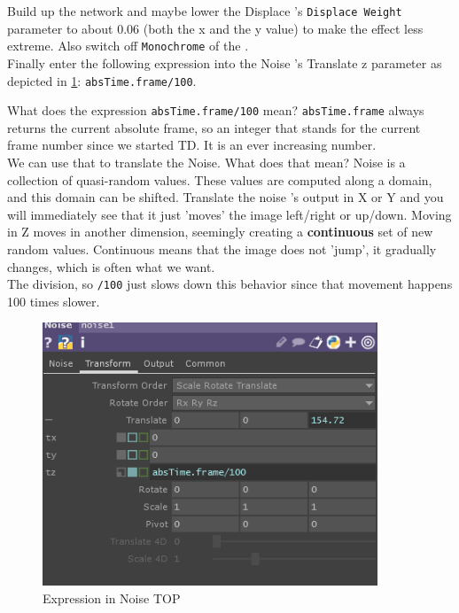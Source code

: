 Build up the network and maybe lower the Displace \TOP's \texttt{Displace Weight} parameter to about $0.06$ (both the x and the y value) to make the effect less extreme. Also switch off \texttt{Monochrome} of the .\\
Finally enter the following expression into the Noise \TOP's Translate z parameter as depicted in \ref{fig:expressionNoiseTOP}: \texttt{absTime.frame/100}.

\begin{framed}
	What does the expression \texttt{absTime.frame/100} mean? \texttt{absTime.frame} always returns the current absolute frame, so an integer that stands for the current frame number since we started TD. It is an ever increasing number.\\
	We can use that to translate the Noise. What does that mean? Noise is a collection of quasi-random values. These values are computed along a domain, and this domain can be shifted. Translate the noise \TOP's output in X or Y and you will immediately see that it just 'moves' the image left/right or up/down. Moving in Z moves in another dimension, seemingly creating a \textbf{continuous} set of new random values. Continuous means that the image does not 'jump', it gradually changes, which is often what we want.\\
	The division, so \texttt{/100} just slows down this behavior since that movement happens 100 times slower.
\end{framed}

\begin{figure}[H]
	\centering
	\includegraphics[width=10cm]{img/noiseTopExpr.PNG}
	\caption[An expression in the Transform parameter of the Noise \TOP.]
	{Expression in Noise TOP}
	\label{fig:expressionNoiseTOP}
\end{figure}



